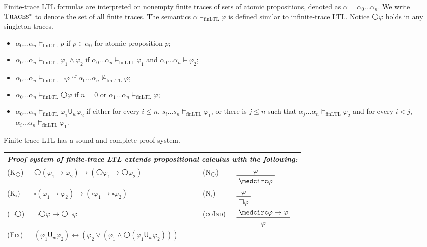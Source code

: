 \documentclass[acmsmall,review,anonymous]{acmart}
\newcommand{\imp}{\to}
\newcommand{\dimp}{\leftrightarrow}
\newcommand{\finLTL}{\mathrm{finLTL}}
\newcommand{\prule}[1]{\textsc{(#1)}}
\newcommand{\wnext}{{\medcirc}}
\newcommand{\always}{{\square}}
\newcommand{\Uw}{\mathbin{\mathsf{U}_w}}
\newcommand{\finTraces}{\textsc{Traces$^*$}\xspace}
\begin{document}
Finite-trace LTL formulas are interpreted on nonempty finite traces
of sets of atomic propositions, denoted as
$\alpha = \alpha_0 \dots \alpha_n$.
We write $\finTraces$ to denote the set of all finite traces.
The semantics $\alpha \vDash_\finLTL \varphi$ is defined
similar to infinite-trace LTL.
Notice $\wnext \varphi$ holds in any singleton traces.
\begin{itemize}
	\item $\alpha_0 \dots \alpha_n 
	\vDash_\finLTL p$ if $p \in \alpha_0$ for atomic proposition $p$;
	\item $\alpha_0 \dots \alpha_n  \vDash_\finLTL \varphi_1 \wedge \varphi_2$
	if $\alpha_0 \dots \alpha_n  \vDash_\finLTL \varphi_1$ and 
	$\alpha_0 \dots \alpha_n  \vDash \varphi_2$;
	\item $\alpha_0 \dots \alpha_n  \vDash_\finLTL \neg \varphi$
	if $\alpha_0 \dots \alpha_n  \not\vDash_\finLTL \varphi$;
	\item $\alpha_0 \dots \alpha_n \vDash_\finLTL \wnext \varphi$
	if $n = 0$ or $\alpha_1 \dots \alpha_n \vDash_\finLTL \varphi$;
	\item $\alpha_0 \dots \alpha_n \vDash_\finLTL \varphi_1 \Uw \varphi_2$
	if either for every $i \le n$,
	$s_i \dots s_n \vDash_\finLTL \varphi_1$,
	or there is $j \le n$ such that
	$\alpha_j \dots \alpha_n \vDash_\finLTL \varphi_2$ and for every $i < j$,
	$\alpha_i \dots \alpha_n \vDash_\finLTL \varphi_1$.
\end{itemize}
Finite-trace LTL has a sound and complete proof system.
\begin{center}
\begin{tabular}{lm{6cm}lm{3cm}}
\multicolumn{4}{l}{
\em
Proof system of finite-trace LTL extends propositional calculus with the following:
}
\\\hline
\prule{K$_\wnext$}
&
$\wnext (\varphi_1 \imp \varphi_2) \imp (\wnext \varphi_1 \imp \wnext 
\varphi_2)$
&
\prule{N$_\wnext$}
&
$\prftree{\varphi}{\wnext \varphi}$
\\
\prule{K$_\always$}
&
$\always (\varphi_1 \imp \varphi_2) \imp (\always \varphi_1 \imp \always 
\varphi_2)$
&
\prule{N$_\always$}
&
$\prftree{\varphi}{\always \varphi}$
\\
\prule{$\neg \wnext$}
&
$\neg \wnext \varphi \imp \wnext \neg \varphi$
&
\prule{coInd}
&
$\prftree{\wnext \varphi \imp \varphi}{\varphi}
$
\\
\prule{Fix}
&
$(\varphi_1 \Uw \varphi_2) 
\dimp 
(\varphi_2 \vee (\varphi_1 \wedge \wnext (\varphi_1 \Uw \varphi_2)))$
\end{tabular}
\end{center}
\end{document}
